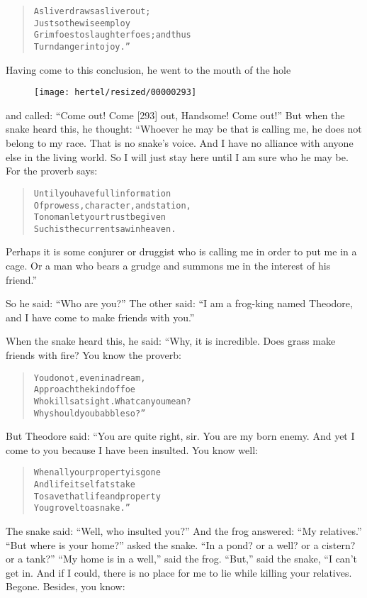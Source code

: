 \documentclass[article, twoside, 10pt]{memoir}
\renewenvironment{verbatim}{%
\begin{quote}%
\vskip -10pt%
\begin{alltt}\normalfont\small}{\end{alltt}%
\end{quote}%
\vskip -10pt
} %
\begin{document}
\begin{verbatim}
A sliver draws a sliver out;
    Just so the wise employ
Grim foes to slaughter foes; and thus
    Turn danger into joy.”
\end{verbatim}
Having come to this conclusion, he went to the mouth of the hole
\begin{figure}[p]\texttt{[image: hertel/resized/00000293]}\end{figure}and called: ``Come out! Come [293] out, Handsome! Come out!'' But
when the snake heard this, he thought: “Whoever he may be that is
calling me, he does not belong to my race. That is no snake's
voice. And I have no alliance with anyone else in the living world.
So I will just stay here until I am sure who he may be. For the
proverb says:

\begin{verbatim}
Until you have full information
Of prowess, character, and station,
To no man let your trust be given{\textemdash}
Such is the current saw in heaven.
\end{verbatim}
Perhaps it is some conjurer or druggist who is calling me in order
to put me in a cage. Or a man who bears a grudge and summons me in
the interest of his friend.”

So he said: ``Who are you?'' The other said:
``I am a frog-king named Theodore, and I have come to make friends with you.''

When the snake heard this, he said: “Why, it is incredible. Does
grass make friends with fire? You know the proverb:

\begin{verbatim}
You do not, even in a dream,
    Approach the kind of foe
Who kills at sight. What can you mean?
    Why should you babble so?”
\end{verbatim}
But Theodore said: “You are quite right, sir. You are my born
enemy. And yet I come to you because I have been insulted. You know
well:

\begin{verbatim}
When all your property is gone
    And life itself at stake{\textemdash}
To save that life and property
    You grovel to a snake.”
\end{verbatim}
The snake said: ``Well, who insulted you?'' And the frog answered:
``My relatives.'' ``But where is your home?'' asked the snake.
``In a pond? or a well? or a cistern? or a tank?''
``My home is in a well,'' said the frog. ``But,'' said the snake,
“I can't get in. And if I could, there is no place for me to lie
while killing your relatives. Begone. Besides, you know:
\end{document}
